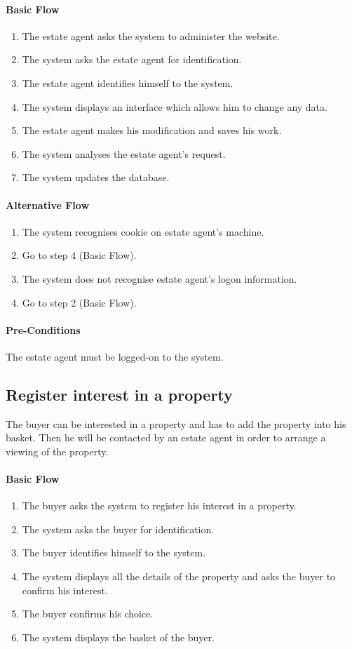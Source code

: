 \documentclass[a4paper,12pt]{article}
\begin{document}
\paragraph{Basic Flow}
\begin{enumerate}
\item The estate agent asks the system to administer the website.
\item The system asks the estate agent for identification.
\item The estate agent identifies himself to the system.
\item The system displays an interface which allows him to change any data.
\item The estate agent makes his modification and saves his work.
\item The system analyses the estate agent's request.
\item The system updates the database.
\end{enumerate}
\paragraph{Alternative Flow}
\begin{enumerate}
\item The system recognises cookie on estate agent's machine.
\item Go to step 4 (Basic Flow).
\item The system does not recognise estate agent's logon information.
\item Go to step 2 (Basic Flow).
\end{enumerate}
\paragraph{Pre-Conditions}
The estate agent must be logged-on to the system.



\subsection{Register interest in a property}
The buyer can be interested in a property and has to add the property into his basket. Then he will be contacted by an estate agent in order to arrange a viewing of the property.
\paragraph{Basic Flow}
\begin{enumerate}
\item The buyer asks the system to register his interest in a property.
\item The system asks the buyer for identification.
\item The buyer identifies himself to the system.
\item The system displays all the details of the property and asks the buyer to confirm his interest.
\item The buyer confirms his choice.
\item The system displays the basket of the buyer.
\end{enumerate}
\end{document}

